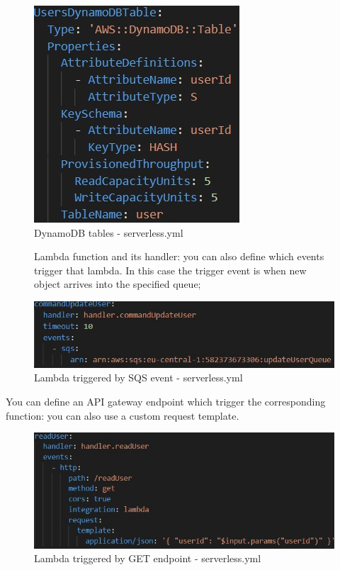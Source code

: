\begin{itemize}
\begin{figure} [H]
	\centering
	\includegraphics[scale=1.2]{../Img/serv3}
	\caption{DynamoDB tables - serverless.yml}\label{}
\end{figure}

\begin{figure} [H]
\item Lambda function and its handler: you can also define which events trigger that lambda. In this case the trigger event is when new object arrives into the specified queue; 

	\centering
	\includegraphics[scale=1.2]{../Img/serv4}
	\caption{Lambda triggered by SQS event - serverless.yml}\label{}
\end{figure}

\item You can define an API gateway endpoint which trigger the corresponding function: you can also use a custom request template.
\begin{figure} [H]
	\centering
	\includegraphics[scale=1.2]{../Img/serv5}
	\caption{Lambda triggered by GET endpoint - serverless.yml}\label{}
\end{figure}

\end{itemize}


